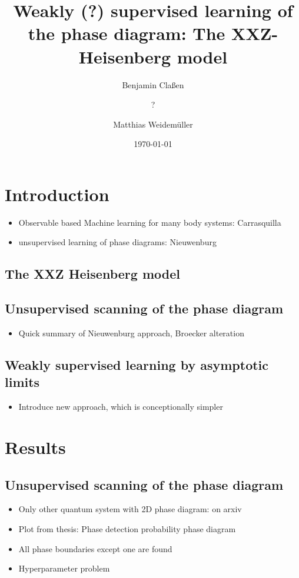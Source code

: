 \documentclass[pre, reprint, draft, twocolumn]{revtex4-1}
\begin{document}
	\title{Weakly (?) supervised learning of the phase diagram: The XXZ-Heisenberg model}
	\date{\today}
	\author{Benjamin Claßen}
	\author{?}
	\author{Matthias Weidemüller}
	\begin{abstract}
		
		\blindtext
	\end{abstract}
	\maketitle
	
	\section{Introduction}
	\begin{itemize}
		\item Observable based Machine learning for many body systems: Carrasquilla
		\item unsupervised learning of phase diagrams: Nieuwenburg
	\end{itemize}
	\blindtext[2]
	\subsection{The XXZ Heisenberg model}
	\blindtext[2]
	
	\subsection{Unsupervised scanning of the phase diagram}
	\begin{itemize}
		\item Quick summary of Nieuwenburg approach, Broecker alteration
	\end{itemize}
	\blindtext[1]
	\subsection{Weakly supervised learning by asymptotic limits}
	\begin{itemize}
		\item Introduce new approach, which is conceptionally simpler
	\end{itemize}
	\blindtext[2]
	
	\section{Results}
	\subsection{Unsupervised scanning of the phase diagram}
	\begin{itemize}
		\item Only other quantum system with 2D phase diagram: on arxiv
		\item Plot from thesis: Phase detection probability phase diagram
		\item All phase boundaries except one are found
		\item Hyperparameter problem
	\end{itemize}
	\blindtext[3]
	
\end{document}
